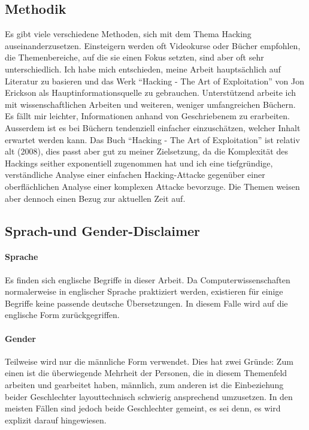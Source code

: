 \documentclass[11pt, a4paper]{article}
\begin{document}
\subsection{Methodik}
Es gibt viele verschiedene Methoden, sich mit dem Thema Hacking auseinanderzusetzen. Einsteigern werden oft Videokurse oder Bücher empfohlen, die Themenbereiche, auf die sie einen Fokus setzten, sind aber oft sehr unterschiedlich. Ich habe mich entschieden, meine Arbeit hauptsächlich auf Literatur zu basieren und das Werk ``Hacking - The Art of Exploitation'' von Jon Erickson als Hauptinformationsquelle zu gebrauchen. Unterstützend arbeite ich mit wissenschaftlichen Arbeiten und weiteren, weniger umfangreichen Büchern. Es fällt mir leichter, Informationen anhand von Geschriebenem zu erarbeiten. Ausserdem ist es bei Büchern tendenziell einfacher einzuschätzen, welcher Inhalt erwartet werden kann. Das Buch ``Hacking - The Art of Exploitation'' ist relativ alt (2008), dies passt aber gut zu meiner Zielsetzung, da die Komplexität des Hackings seither exponentiell zugenommen hat und ich eine tiefgründige, verständliche Analyse einer einfachen Hacking-Attacke gegenüber einer oberflächlichen Analyse einer komplexen Attacke bevorzuge. Die Themen weisen aber dennoch einen Bezug zur aktuellen Zeit auf.

\subsection*{Sprach-und Gender-Disclaimer}
\paragraph{Sprache}
Es finden sich englische Begriffe in dieser Arbeit. Da Computerwissenschaften normalerweise in englischer Sprache praktiziert werden, existieren für einige Begriffe keine passende deutsche Übersetzungen. In diesem Falle wird auf die englische Form zurückgegriffen.
\paragraph{Gender}
Teilweise wird nur die männliche Form verwendet. Dies hat zwei Gründe: Zum einen ist die überwiegende Mehrheit der Personen, die in diesem Themenfeld arbeiten und gearbeitet haben, männlich, zum anderen ist die Einbeziehung beider Geschlechter layouttechnisch schwierig ansprechend umzusetzen. In den meisten Fällen sind jedoch beide Geschlechter gemeint, es sei denn, es wird explizit darauf hingewiesen.
\end{document}
